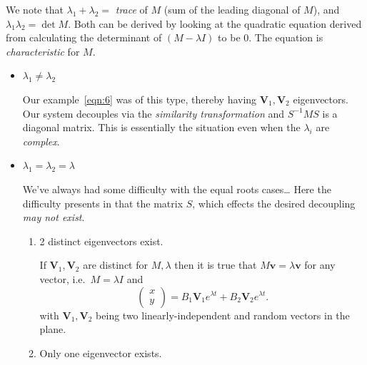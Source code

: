 \documentclass[12pt]{report}
\theoremstyle{definition}
\begin{document}
We note that $\lambda_1 + \lambda_2 =$ \emph{trace} of $M$ (sum of the leading diagonal of $M$),
and $\lambda_1\lambda_2 = \det{M}$. Both can be derived by looking at the quadratic equation
derived from calculating the determinant of $(M - \lambda I)$ to be $0$.
The equation is \emph{characteristic} for $M$.
\begin{itemize}
        \item $\lambda_1 \neq \lambda_2$

            Our example~\eqref{eqn:6} was of this type, thereby having
            $\mathbf{V}_1, \mathbf{V}_2$ eigenvectors. Our system decouples via 
            the \emph{similarity transformation} and $S^{-1}MS$ is a diagonal matrix.  
            This is essentially the situation even when the $\lambda_i$ are \emph{complex}.

        \item $\lambda_1 = \lambda_2 = \lambda$

            We've always had some difficulty with the equal roots cases\ldots
            Here the difficulty presents in that the matrix $S$, which effects
            the desired decoupling \emph{may not exist}.

            \begin{enumerate}[label = (\roman*)]
                \item 2 distinct eigenvectors exist.
                    
                    If $\mathbf{V}_1, \mathbf{V}_2$ are distinct for $M, \lambda$
                    then it is true that $M\mathbf{v} = \lambda\mathbf{v}$ for any vector,
                    i.e.\ $M = \lambda I$ and\[
                        \begin{pmatrix}
                                x \\
                                y
                        \end{pmatrix} = B_1 \mathbf{V}_1 e^{\lambda t} + B_2 \mathbf{V}_2 e^{\lambda t}.
                    \]
                    with $\mathbf{V}_1, \mathbf{V}_2$ being two linearly-independent 
                    and random vectors in the plane.

                \item Only one eigenvector exists.


\end{enumerate}
\end{itemize}
\end{document}
